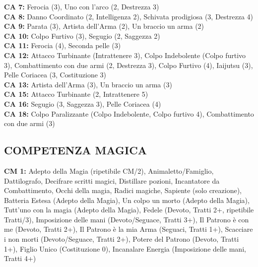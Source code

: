 \begin{multicols}{2}
	\textbf{CA 7:} Ferocia (3), Uno con l'arco (2, Destrezza 3)\\

	\textbf{CA 8:} Danno Coordinato (2, Intelligenza 2), Schivata prodigiosa (3, Destrezza 4)\\

	\textbf{CA 9:} Parata (3), Artista dell'Arma (2), Un braccio un arma (2)\\

	\textbf{CA 10:} Colpo Furtivo (3), Segugio (2, Saggezza 2)\\

	\textbf{CA 11:} Ferocia (4), Seconda pelle (3)\\

	\textbf{CA 12:} Attacco Turbinante (Intrattenere 3), Colpo Indebolente (Colpo furtivo 3), Combattimento con due armi (2, Destrezza 3), Colpo Furtivo (4), Iaijutsu (3), Pelle Coriacea (3, Costituzione 3)\\

	\textbf{CA 13:} Artista dell'Arma (3), Un braccio un arma (3)\\

	\textbf{CA 15:} Attacco Turbinante (2, Intrattenere 5)\\

	\textbf{CA 16:} Segugio (3, Saggezza 3), Pelle Coriacea (4)\\

	\textbf{CA 18:} Colpo Paralizzante (Colpo Indebolente, Colpo furtivo 4), Combattimento con due armi (3)\\

	\subsection{COMPETENZA MAGICA}

	\textbf{CM 1:} Adepto della Magia (ripetibile CM/2), Animaletto/Famiglio, Dattilografo, Decifrare scritti magici, Distillare pozioni, Incantatore da Combattimento, Occhi della magia, Radici magiche, Sapiente (solo creazione), Batteria Estesa (Adepto della Magia), Un colpo un morto (Adepto della Magia), Tutt'uno con la magia (Adepto della Magia), Fedele (Devoto, Tratti 2+, ripetibile Tratti/3), Imposizione delle mani (Devoto/Seguace, Tratti 3+), Il Patrono è con me (Devoto, Tratti 2+), Il Patrono è la mia Arma (Seguaci, Tratti 1+), Scacciare i non morti (Devoto/Seguace, Tratti 2+), Potere del Patrono (Devoto, Tratti 1+), Figlio Unico (Costituzione 0), Incanalare Energia (Imposizione delle mani, Tratti 4+)\\


\end{multicols}
